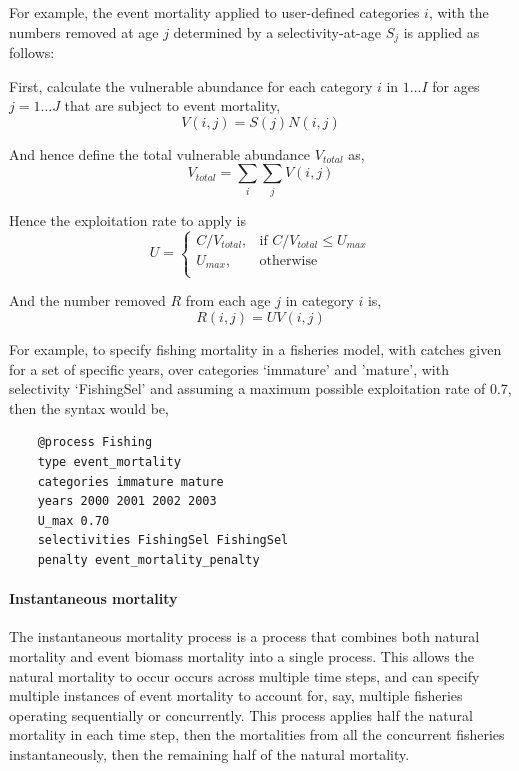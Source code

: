 For example, the event mortality applied to user-defined categories $i$, with the numbers removed at age $j$ determined by a selectivity-at-age $S_j$ is applied as follows:

First, calculate the vulnerable abundance for each category $i$ in $1 \ldots I$ for ages $j = 1 \ldots J$ that are subject to event mortality,
\begin{equation}
  V(i,j) = S(j) N(i,j)
\end{equation}

And hence define the total vulnerable abundance $V_{total}$ as,
\begin{equation}
  V_{total}  = \sum\limits_i {\sum\limits_j {V(i,j)}} 
\end{equation}

Hence the exploitation rate to apply is 
\begin{equation}
U = \begin{cases}
  C/V_{total}, & \text{if $C/V_{total} \leq U_{max}$} \\
  U_{max}, & \text{otherwise}\\ 
  \end{cases} 
\end{equation}

And the number removed $R$ from each age $j$ in category $i$ is,
\begin{equation}
  R(i,j) = UV(i,j)
\end{equation}

For example, to specify fishing mortality in a fisheries model, with catches given for a set of specific years, over categories `immature' and 'mature', with selectivity `FishingSel' and assuming a maximum possible exploitation rate of 0.7, then the syntax would be,

{\small{\begin{verbatim}
	@process Fishing
	type event_mortality
	categories immature mature
	years 2000 2001 2002 2003
	U_max 0.70
	selectivities FishingSel FishingSel
	penalty event_mortality_penalty
	\end{verbatim}}}

\paragraph{Instantaneous mortality}

The instantaneous mortality process is a process that combines both natural mortality and event biomass mortality into a single process. This allows the natural mortality to occur occurs across multiple time steps, and can specify multiple instances of event mortality to account for, say, multiple fisheries operating sequentially or concurrently. This process applies half the natural mortality in each time step, then the mortalities from all the concurrent fisheries instantaneously, then the remaining half of the natural mortality.

